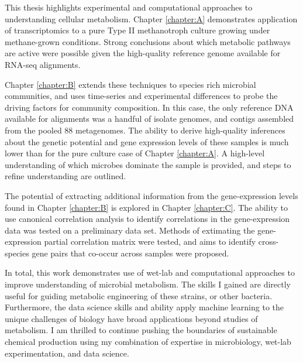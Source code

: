 This thesis highlights experimental and computational approaches to understanding cellular metabolism.
Chapter \ref{chapter:A} demonstrates application of transcriptomics to a pure Type II methanotroph culture growing under methane-grown conditions.
Strong conclusions about which metabolic pathways are active were possible given the high-quality reference genome available for RNA-seq alignments.

Chapter \ref{chapter:B} extends these techniques to species rich microbial communities, and uses time-series and experimental differences to probe the driving factors for community composition.
In this case, the only reference DNA available for alignments was a handful of isolate genomes, and contigs assembled from the pooled 88 metagenomes.
The ability to derive high-quality inferences about the genetic potential and gene expression levels of these samples is much lower than for the pure culture case of Chapter \ref{chapter:A}.
A high-level understanding of which microbes dominate the sample is provided, and steps to refine understanding are outlined.

The potential of extracting additional information from the gene-expression levels found in Chapter \ref{chapter:B} is explored in Chapter \ref{chapter:C}.
The ability to use canonical correlation analysis to identify correlations in the gene-expression data was tested on a preliminary data set.
Methods of extimating the gene-expression partial correlation matrix were tested, and aims to identify cross-species gene pairs that co-occur across samples were proposed.

In total, this work demonstrates use of wet-lab and computational approaches to improve understanding of microbial metabolism.
The skills I gained are directly useful for guiding metabolic engineering of these strains, or other bacteria.
Furthermore, the data science skills and ability apply machine learning to the unique challenges of biology have broad applications beyond studies of metabolism.
I am thrilled to continue pushing the boundaries of sustainable chemical production using my combination of expertise in microbiology, wet-lab experimentation, and data science.

